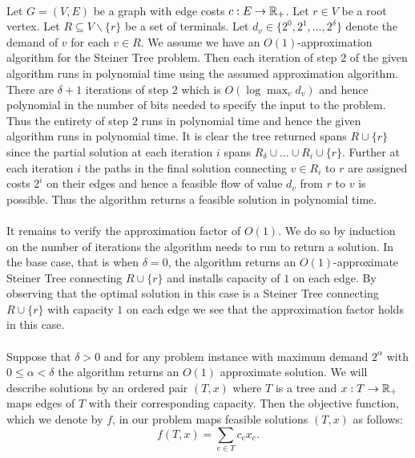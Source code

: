 \documentclass[letterpaper,12pt,oneside,onecolumn]{article}
\begin{document}
\paragraph{}
Let $G = (V,E)$ be a graph with edge costs $c: E \rightarrow \mathbb{R}_+$. Let $r \in V$ be a root vertex. Let $R \subseteq V \backslash \{r\}$ be a set of terminals. Let $d_v \in \{2^0, 2^1, \dots, 2^\delta\}$ denote the demand of $v$ for each $v \in R$. We assume we have an $O(1)$-approximation algorithm for the Steiner Tree problem. Then each iteration of step $2$ of the given algorithm runs in polynomial time using the assumed approximation algorithm. There are $\delta+1$ iterations of step $2$ which is $O(\log \max_v d_v)$ and hence polynomial in the number of bits needed to specify the input to the problem. Thus the entirety of step $2$ runs in polynomial time and hence the given algorithm runs in polynomial time. It is clear the tree returned spans $R \cup \{r\}$ since the partial solution at each iteration $i$ spans $R_\delta \cup \dots \cup R_i \cup \{r\}$. Further at each iteration $i$ the paths in the final solution connecting $v \in R_i$ to $r$ are assigned costs $2^i$ on their edges and hence a feasible flow of value $d_v$ from $r$ to $v$ is possible. Thus the algorithm returns a feasible solution in polynomial time.
\paragraph{}
It remains to verify the approximation factor of $O(1)$. We do so by induction on the number of iterations the algorithm needs to run to return a solution. In the base case, that is when $\delta = 0$, the algorithm returns an $O(1)$-approximate Steiner Tree connecting $R \cup \{r\}$ and installs capacity of $1$ on each edge. By observing that the optimal solution in this case is a Steiner Tree connecting $R \cup \{r\}$ with capacity $1$ on each edge we see that the approximation factor holds in this case.
\paragraph{}
Suppose that $\delta > 0$ and for any problem instance with maximum demand $2^{\alpha}$ with $0 \leq \alpha < \delta$ the algorithm returns an $O(1)$ approximate solution. We will describe solutions by an ordered pair $(T, x)$ where $T$ is a tree and $x : T \rightarrow \mathbb{R}_+$ maps edges of $T$ with their corresponding capacity. Then the objective function, which we denote by $f$, in our problem maps feasible solutions $(T,x)$ as follows:
$$f(T,x) = \sum_{e \in T} c_e x_e.$$
\end{document}

